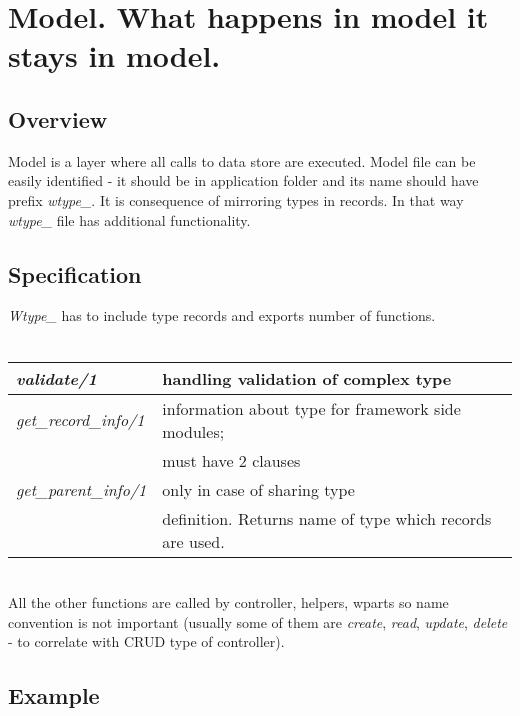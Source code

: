 \section{Model. What happens in model it stays in model.}\label{model}
\subsection{Overview}
Model is a layer where all calls to data store are executed. Model file can be
easily identified - it should be in application folder and its name should have
prefix \emph{wtype\_}. It is consequence of mirroring types in records. In that
way \emph{wtype\_} file has additional functionality. 
\subsection{Specification}
\emph{Wtype\_} has to include type records and exports number of functions.
\\  \\
\begin{tabular}{l|l}
\emph{validate/1} &  handling validation of complex type  \\ \hline
\emph{get\_record\_info/1} & information about type for framework side
 modules;\\  
 &  must have 2 clauses \\ \hline
\emph{get\_parent\_info/1} & only in case of sharing type \\  
 & definition. Returns name of type which records are used.
\end{tabular}
\newline \\
All the other functions are called by controller, helpers, wparts so name
convention is not important (usually some of them are \emph{create}, \emph{read},
\emph{update}, \emph{delete} - to correlate with CRUD type of controller). 

\subsection{Example}
